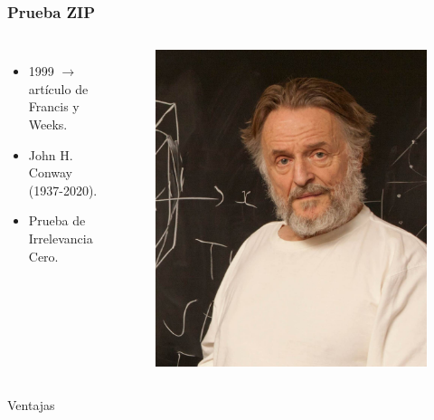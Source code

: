 \documentclass{beamer}
\theoremstyle{definition}
\begin{document}
\begin{frame}
\frametitle{Prueba ZIP}

\begin{columns}
\begin{itemize}

\item 1999 $\longrightarrow$ artículo de Francis y Weeks.

\item John H. Conway (1937-2020).

\item Prueba de Irrelevancia Cero. 
\end{itemize}

\begin{figure}
\includegraphics[scale=.07]{conway.jpg}
\end{figure}

\end{columns}

\pause

\begin{block}{Ventajas}


\end{block}
\end{frame}
\end{document}
